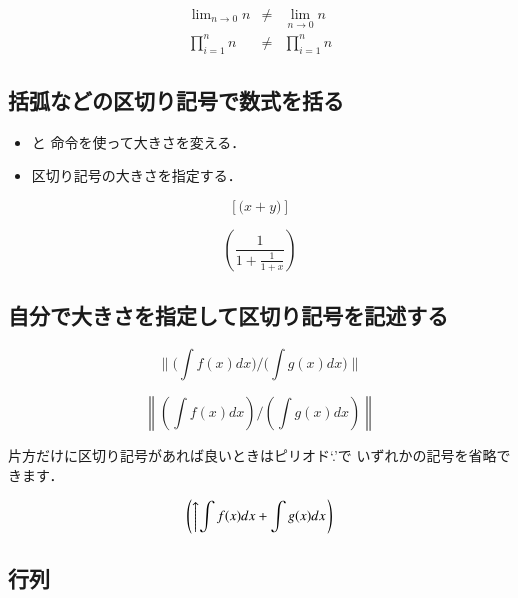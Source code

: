 \begin{inout}
\begin{eqnarray*}
\lim\nolimits_{n\to 0} n & \neq & \lim_{n\to 0} n\\
\prod^n_{i=1}n & \neq &    \prod\nolimits^n_{i=1} n
\end{eqnarray*}
\end{inout}
 
\subsection{括弧などの区切り記号で数式を括る}

\begin{itemize}
 \item {}と 命令を使って大きさを変える．
 \item 区切り記号の大きさを指定する．
\end{itemize}

\begin{inout}
\[ \left[ \Big(x+y\Big) \right] \]
\end{inout}

\begin{inout}
\[ \left( \frac{1}{1+\frac{1}{1+x}} \right)  \]
\end{inout}

\subsection{自分で大きさを指定して区切り記号を記述する}
%
%

\begin{inout}
\begin{displaymath}
\Biggl\| \Biggl(\int f(x) dx\Biggr) 
  \Bigg/ \Biggl(\int g(x) dx\Biggr) 
\Biggr\| 
\end{displaymath}
\end{inout}


\begin{inout}
\[ \left\| 
 \left(\int f(x) dx\right) 
 \Bigg/ \left(\int g(x) dx\right) 
 \right\| \]
\end{inout}
片方だけに区切り記号があれば良いときはピリオド`{\str.}'で
いずれかの記号を省略できます．
\begin{inout}
\[ \left( \left\uparrow 
   \int f(x)dx + \int g(x)dx
   \right. \right) \] 
\end{inout}

\subsection{行列}

